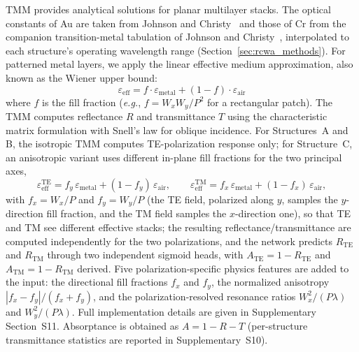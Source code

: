 \documentclass[a4paper,fleqn]{cas-sc}
\newcommand{\eg}{\textit{e.g.}}
\begin{document}
TMM provides analytical solutions for planar multilayer stacks. The optical constants of Au are taken from Johnson and Christy~\cite{johnson1972optical} and those of Cr from the companion transition-metal tabulation of Johnson and Christy~\cite{johnson1974transition}, interpolated to each structure's operating wavelength range (Section~\ref{sec:rcwa_methods}). For patterned metal layers, we apply the linear effective medium approximation, also known as the Wiener upper bound:
\begin{equation}
\varepsilon_\text{eff} = f \cdot \varepsilon_\text{metal} + (1-f) \cdot \varepsilon_\text{air}
\label{eq:ema}
\end{equation}
where $f$ is the fill fraction (\eg, $f = W_x W_y / P^2$ for a rectangular patch). The TMM computes reflectance $R$ and transmittance $T$ using the characteristic matrix formulation with Snell's law for oblique incidence. For Structures~A and B, the isotropic TMM computes TE-polarization response only; for Structure~C, an anisotropic variant uses different in-plane fill fractions for the two principal axes,
\begin{equation}
\varepsilon_\text{eff}^\text{TE} = f_y\,\varepsilon_\text{metal} + (1-f_y)\,\varepsilon_\text{air}, \qquad
\varepsilon_\text{eff}^\text{TM} = f_x\,\varepsilon_\text{metal} + (1-f_x)\,\varepsilon_\text{air},
\label{eq:ema_aniso}
\end{equation}
with $f_x = W_x/P$ and $f_y = W_y/P$ (the TE field, polarized along $y$, samples the $y$-direction fill fraction, and the TM field samples the $x$-direction one), so that TE and TM see different effective stacks; the resulting reflectance/transmittance are computed independently for the two polarizations, and the network predicts $R_\text{TE}$ and $R_\text{TM}$ through two independent sigmoid heads, with $A_\text{TE}=1-R_\text{TE}$ and $A_\text{TM}=1-R_\text{TM}$ derived. Five polarization-specific physics features are added to the input: the directional fill fractions $f_x$ and $f_y$, the normalized anisotropy $|f_x-f_y|/(f_x+f_y)$, and the polarization-resolved resonance ratios $W_x^2/(P\lambda)$ and $W_y^2/(P\lambda)$. Full implementation details are given in Supplementary Section~S11. Absorptance is obtained as $A = 1 - R - T$ (per-structure transmittance statistics are reported in Supplementary~S10).
\end{document}
